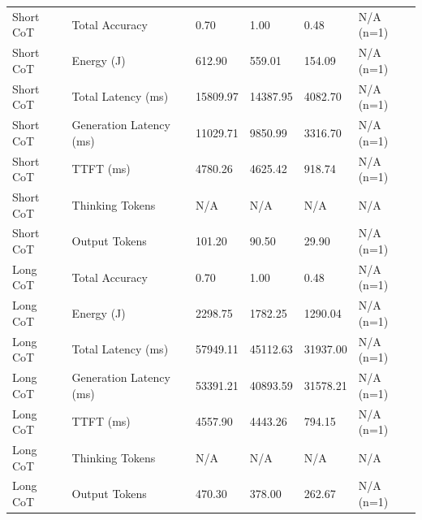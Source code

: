\begin{table}
\begin{tabular}{llllll}
Short CoT & Total Accuracy & 0.70 & 1.00 & 0.48 & N/A (n=1) \\
Short CoT & Energy (J) & 612.90 & 559.01 & 154.09 & N/A (n=1) \\
Short CoT & Total Latency (ms) & 15809.97 & 14387.95 & 4082.70 & N/A (n=1) \\
Short CoT & Generation Latency (ms) & 11029.71 & 9850.99 & 3316.70 & N/A (n=1) \\
Short CoT & TTFT (ms) & 4780.26 & 4625.42 & 918.74 & N/A (n=1) \\
Short CoT & Thinking Tokens & N/A & N/A & N/A & N/A \\
Short CoT & Output Tokens & 101.20 & 90.50 & 29.90 & N/A (n=1) \\
Long CoT & Total Accuracy & 0.70 & 1.00 & 0.48 & N/A (n=1) \\
Long CoT & Energy (J) & 2298.75 & 1782.25 & 1290.04 & N/A (n=1) \\
Long CoT & Total Latency (ms) & 57949.11 & 45112.63 & 31937.00 & N/A (n=1) \\
Long CoT & Generation Latency (ms) & 53391.21 & 40893.59 & 31578.21 & N/A (n=1) \\
Long CoT & TTFT (ms) & 4557.90 & 4443.26 & 794.15 & N/A (n=1) \\
Long CoT & Thinking Tokens & N/A & N/A & N/A & N/A \\
Long CoT & Output Tokens & 470.30 & 378.00 & 262.67 & N/A (n=1) \\
\bottomrule
\end{tabular}
\end{table}

